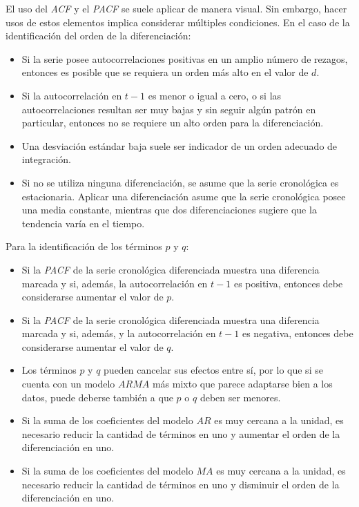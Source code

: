 \documentclass[
]{article}
\providecommand{\tightlist}{%
  \setlength{\itemsep}{0pt}\setlength{\parskip}{0pt}}
\begin{document}
El uso del \emph{ACF} y el \emph{PACF} se suele aplicar de manera
visual. Sin embargo, hacer usos de estos elementos implica considerar
múltiples condiciones. En el caso de la identificación del orden de la
diferenciación:

\begin{itemize}
\tightlist
\item
  Si la serie posee autocorrelaciones positivas en un amplio número de
  rezagos, entonces es posible que se requiera un orden más alto en el
  valor de \(d\).
\item
  Si la autocorrelación en \(t-1\) es menor o igual a cero, o si las
  autocorrelaciones resultan ser muy bajas y sin seguir algún patrón en
  particular, entonces no se requiere un alto orden para la
  diferenciación.
\item
  Una desviación estándar baja suele ser indicador de un orden adecuado
  de integración.
\item
  Si no se utiliza ninguna diferenciación, se asume que la serie
  cronológica es estacionaria. Aplicar una diferenciación asume que la
  serie cronológica posee una media constante, mientras que dos
  diferenciaciones sugiere que la tendencia varía en el tiempo.
\end{itemize}

Para la identificación de los términos \(p\) y \(q\):

\begin{itemize}
\tightlist
\item
  Si la \emph{PACF} de la serie cronológica diferenciada muestra una
  diferencia marcada y si, además, la autocorrelación en \(t-1\) es
  positiva, entonces debe considerarse aumentar el valor de \(p\).
\item
  Si la \emph{PACF} de la serie cronológica diferenciada muestra una
  diferencia marcada y si, además, y la autocorrelación en \(t-1\) es
  negativa, entonces debe considerarse aumentar el valor de \(q\).
\item
  Los términos \(p\) y \(q\) pueden cancelar sus efectos entre sí, por
  lo que si se cuenta con un modelo \(ARMA\) más mixto que parece
  adaptarse bien a los datos, puede deberse también a que \(p\) o \(q\)
  deben ser menores.
\item
  Si la suma de los coeficientes del modelo \(AR\) es muy cercana a la
  unidad, es necesario reducir la cantidad de términos en uno y aumentar
  el orden de la diferenciación en uno.
\item
  Si la suma de los coeficientes del modelo \(MA\) es muy cercana a la
  unidad, es necesario reducir la cantidad de términos en uno y
  disminuir el orden de la diferenciación en uno.
\end{itemize}
\end{document}
